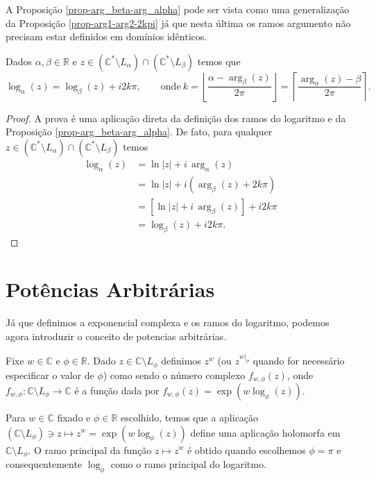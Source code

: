 \begin{observacao}
A Proposição \ref{prop-arg_beta-arg_alpha} pode ser vista como 
uma generalização da Proposição \ref{prop-arg1-arg2-2kpi} 
já que nesta última os ramos argumento não precisam estar 
definidos em domínios idênticos.
\end{observacao}



\begin{corolario}
Dados $\alpha,\beta\in\mathbb{R}$ e
$z\in (\mathbb{C}^{*}\setminus L_{\alpha})\cap(\mathbb{C}^{*}\setminus L_{\beta})$  
temos que 
\[
\log_{\alpha}(z)=\log_{\beta}(z)+i2k\pi,\qquad  \text{onde}\ 
k = 
\left\lfloor \frac{\alpha-\arg_{\beta}(z)}{2\pi} \right\rfloor
=
\left\lceil \frac{\arg_{\alpha}(z)-\beta}{2\pi} \right\rceil. 
\]
\end{corolario}
\begin{proof}
A prova é uma aplicação direta da definição dos ramos do logaritmo e da Proposição 
\ref{prop-arg_beta-arg_alpha}. De fato, para qualquer 
$z\in (\mathbb{C}^{*}\setminus L_{\alpha})\cap(\mathbb{C}^{*}\setminus L_{\beta})$  
temos
\begin{align*}
\log_{\alpha}(z)
&=
\ln|z|+i\,\arg_{\alpha}(z)
\\[0.3cm]
&=
\ln|z|+i( \arg_{\beta}(z) + 2k\pi)
\\[0.3cm]
&=
[\ln|z|+i\,\arg_{\beta}(z)] + i2k\pi
\\[0.3cm]
&=
\log_{\beta}(z)+ i2k\pi.
\end{align*}
\end{proof}

\section{Potências Arbitrárias}

Já que definimos a exponencial complexa e os ramos do logaritmo, 
podemos agora introduzir o conceito de potencias arbitrárias. 

\begin{definicao}\label{def-potencias-arbitrarias}
Fixe $w\in\mathbb{C}$ e $\phi\in\mathbb{R}$. 
Dado $z\in \mathbb{C}\setminus L_{\phi}$ definimos $z^w$ (ou  $z^{w|_{\phi}}$
quando for necessário especificar o valor de $\phi$) como
sendo o número complexo $f_{w,\phi}(z)$, onde 
$f_{w,\phi}: \mathbb{C}\setminus L_{\phi}\to \mathbb{C}$ 
é a função dada por $f_{w,\phi}(z) = \exp(w\log_{\phi}(z))$.  
\end{definicao}


Para $w\in\mathbb{C}$ fixado e $\phi\in\mathbb{R}$ escolhido, temos que a aplicação
$(\mathbb{C}\setminus L_{\phi}) \ni z\longmapsto z^{w}=\exp(w\log_{\phi}(z))$
define uma aplicação holomorfa em $\mathbb{C}\setminus L_{\phi}$. O ramo 
principal da função $z\longmapsto z^{w}$ é obtido quando escolhemos $\phi=\pi$ 
e consequentemente $\log_{\phi}$ como o ramo principal do logaritmo. 

